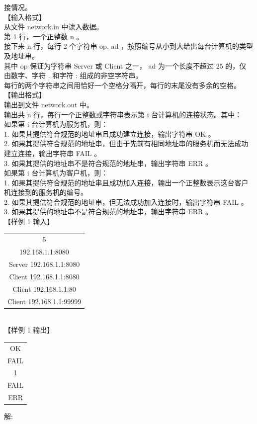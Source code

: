 \documentclass[12pt,twiside,a4paper]{ctexbook}
\numberwithin{chapter}{part}
\begin{document}
接情况。\\
【输入格式】\\
从文件 network.in 中读入数据。\\
第 1 行，一个正整数 n 。\\
接下来 n 行，每行 2 个字符串 op, ad ，按照编号从小到大给出每台计算机的类型
及地址串。\\
其中 op 保证为字符串 Server 或 Client 之一， ad 为一个长度不超过 25 的，仅
由数字、字符 . 和字符 : 组成的非空字符串。\\
每行的两个字符串之间用恰好一个空格分隔开，每行的末尾没有多余的空格。\\
【输出格式】\\
输出到文件 network.out 中。\\
输出共 n 行，每行一个正整数或字符串表示第 i 台计算机的连接状态。其中：\\
如果第 i 台计算机为服务机，则：\\
1. 如果其提供符合规范的地址串且成功建立连接，输出字符串 OK 。\\
2. 如果其提供符合规范的地址串，但由于先前有相同地址串的服务机而无法成功
建立连接，输出字符串 FAIL 。\\
3. 如果其提供的地址串不是符合规范的地址串，输出字符串 ERR 。\\
如果第 i 台计算机为客户机，则：\\
1. 如果其提供符合规范的地址串且成功加入连接，输出一个正整数表示这台客户
机连接到的服务机的编号。\\
2. 如果其提供符合规范的地址串，但无法成功加入连接时，输出字符串 FAIL 。\\
3. 如果其提供的地址串不是符合规范的地址串，输出字符串 ERR 。\\
【样例 1 输入】\\
\begin{tabular}{|c|}
\hline
5\\
192.168.1.1:8080\\
Server 192.168.1.1:8080\\
Client 192.168.1.1:8080\\
Client 192.168.1.1:80\\
Client 192.168.1.1:99999\\
\hline
\end{tabular}\\
【样例 1 输出】\\
\begin{tabular}{|c|}
\hline
OK\\
FAIL\\
1\\
FAIL\\
ERR\\
\hline
\end{tabular}
解:\\
\end{document}
